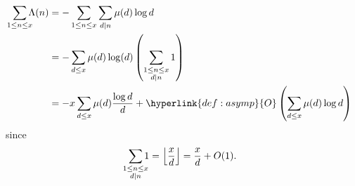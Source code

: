 \documentclass{article}
\DeclarePairedDelimiter\floor{\lfloor}{\rfloor}
\begin{document}
\begin{eg}
  \begin{align*}
    \sum_{\mathclap{1\leq n \leq x}}\Lambda(n) &= -\sum_{1\leq n\leq x}\sum_{d|n}\mu(d)\log d \\
                                    &= - \sum_{d\leq x}\mu(d)\log(d)\left(\sum_{\substack{1\leq n\leq x \\ d|n}}1\right) \\
                                    &= - x \sum_{d\leq x}\mu(d) \frac{\log d}{d} + \hyperlink{def:asymp}{O}\left(\sum_{d\leq x}\mu(d)\log d \right)
  \end{align*}
  since
  \begin{equation*}
    \sum_{\mathclap{\substack{1\leq n\leq x \\ d|n}}}1 = \floor*{\frac{x}{d}}= \frac{x}{d} + O(1).
  \end{equation*}
\end{eg}
\clearpage

\subsection{}
\end{document}
